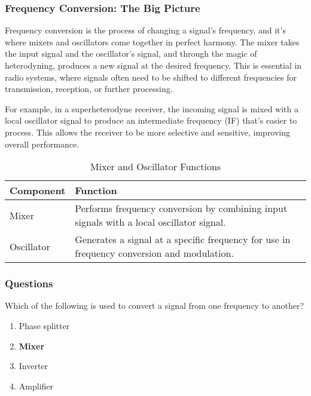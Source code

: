 \subsubsection*{Frequency Conversion: The Big Picture}

Frequency conversion is the process of changing a signal's frequency, and it's where mixers and oscillators come together in perfect harmony. The mixer takes the input signal and the oscillator's signal, and through the magic of heterodyning, produces a new signal at the desired frequency. This is essential in radio systems, where signals often need to be shifted to different frequencies for transmission, reception, or further processing.

For example, in a superheterodyne receiver, the incoming signal is mixed with a local oscillator signal to produce an intermediate frequency (IF) that's easier to process. This allows the receiver to be more selective and sensitive, improving overall performance.


\begin{table}[h!]
    \centering
    \begin{tabular}{|l|l|}
        \hline
        \textbf{Component} & \textbf{Function} \\
        \hline
        Mixer & Performs frequency conversion by combining input signals with a local oscillator signal. \\
        Oscillator & Generates a signal at a specific frequency for use in frequency conversion and modulation. \\
        \hline
    \end{tabular}
    \caption{Mixer and Oscillator Functions}
    \label{tab:mixer-oscillator}
\end{table}

\subsubsection*{Questions}

\begin{tcolorbox}[colback=gray!10!white,colframe=black!75!black,title={T7A03}]
    Which of the following is used to convert a signal from one frequency to another?
    \begin{enumerate}[label=\Alph*),noitemsep]
        \item Phase splitter
        \item \textbf{Mixer}
        \item Inverter
        \item Amplifier
    \end{enumerate}
\end{tcolorbox}

